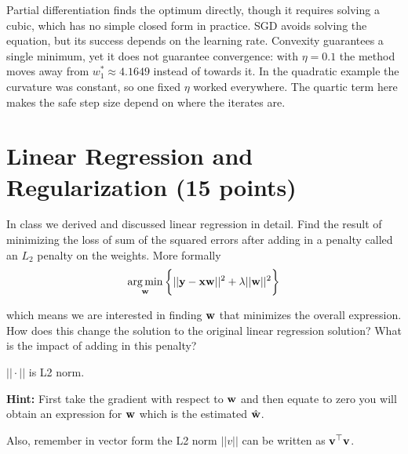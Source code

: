 \documentclass[12pt, xcolor=dvipsnames,svgnames,x11names]{article}
\makeatletter
\newenvironment{multiequation}[1][]{%
\begin{equation}%
   \begin{aligned}%
   \ifx#1\@empty\else\label{#1}\fi%
}{%
   \end{aligned}%
\end{equation}%
}
\makeatother
\begin{document}
\begin{answerbox}
\noindent Partial differentiation finds the optimum directly, though it requires solving a cubic, which has no simple closed form in practice.
SGD avoids solving the equation, but its success depends on the learning rate.
Convexity guarantees a single minimum, yet it does not guarantee convergence: with $\eta = 0.1$ the method moves away from $w_1^{*} \approx 4.1649$ instead of towards it.
In the quadratic example the curvature was constant, so one fixed $\eta$ worked everywhere. The quartic term here makes the safe step size depend on where the iterates are.
\end{answerbox}

\section{Linear Regression and Regularization (15 points)}
In class we derived and discussed linear regression in detail. Find the result of minimizing the
loss of sum of the squared errors after adding in a penalty called an $L_2$ penalty on the weights.
More formally
\begin{multiequation}
\argmin_\wbf \bigg\{ ||\ybf - \xbf \wbf||^2  + \lambda||\wbf||^2  \bigg\}
\end{multiequation}

which means we are interested in finding ${\mathbf w}$ that minimizes the overall expression. How does this change the solution to the original linear regression solution? What is the impact of adding in this penalty?

$|| \cdot ||$ is L2 norm.

\textbf{Hint:} First take the gradient with respect to ${\mathbf w}$ and then equate to zero you will obtain an expression for ${\mathbf w}$ which is the estimated $\hat{{\mathbf w}}$.

Also, remember in vector form the L2 norm $||v||$ can be written as ${\mathbf v}^\top {\mathbf v}$.
\end{document}

